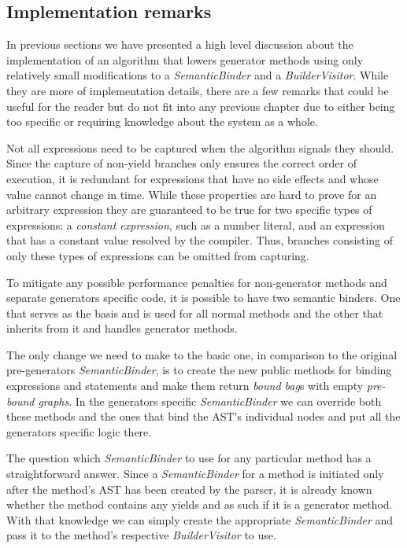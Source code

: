 \subsection{Implementation remarks}

In previous sections we have presented a high level discussion about the implementation of an algorithm that lowers generator methods using only relatively small modifications to a \emph{SemanticBinder} and a \emph{BuilderVisitor}. While they are more of implementation details, there are a few remarks that could be useful for the reader but do not fit into any previous chapter due to either being too specific or requiring knowledge about the system as a whole.

Not all expressions need to be captured when the algorithm signals they should. Since the capture of non-yield branches only ensures the correct order of execution, it is redundant for expressions that have no side effects and whose value cannot change in time. While these properties are hard to prove for an arbitrary expression they are guaranteed to be true for two specific types of expressions: a \emph{constant expression}, such as a number literal, and an expression that has a constant value resolved by the compiler. Thus, branches consisting of only these types of expressions can be omitted from capturing. 

To mitigate any possible performance penalties for non-generator methods and separate generators specific code, it is possible to have two semantic binders. One that serves as the basis and is used for all normal methods and the other that inherits from it and handles generator methods.

The only change we need to make to the basic one, in comparison to the original pre-generators \emph{SemanticBinder}, is to create the new public methods for binding expressions and statements and make them return \emph{bound bag}s with empty \emph{pre-bound graphs}. In the generators specific \emph{SemanticBinder} we can override both these methods and the ones that bind the AST’s individual nodes and put all the generators specific logic there. 

The question which \emph{SemanticBinder} to use for any particular method has a straightforward answer. Since a \emph{SemanticBinder} for a method is initiated only after the method’s AST has been created by the parser, it is already known whether the method contains any yields and as such if it is a generator method. With that knowledge we can simply create the appropriate \emph{SemanticBinder} and pass it to the method’s respective \emph{BuilderVisitor} to use. 

